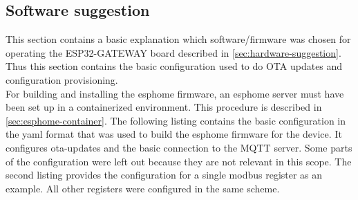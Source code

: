 \subsection{Software suggestion}
\label{sec:software}
	This section contains a basic explanation which software/firmware was chosen for operating the ESP32-GATEWAY board described in \cref{sec:hardware-suggestion}. Thus this section contains the basic configuration used to do \ac{OTA} updates and configuration provisioning.\\
	
	For building and installing the esphome firmware, an esphome server must have been set up in a containerized environment. This procedure is described in \cref{sec:esphome-container}.  The following listing contains the basic configuration in the \ac{yaml} format that was used to build the esphome firmware for the device. It configures ota-updates and the basic connection to the \ac{MQTT} server. Some parts of the configuration were left out because they are not relevant in this scope. The second listing provides the configuration for a single modbus register as an example. All other registers were configured in the same scheme. 
	
